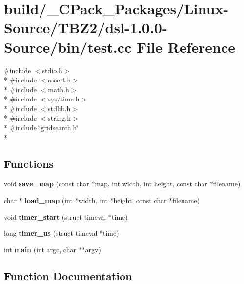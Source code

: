 \section{build/\-\_\-\-C\-Pack\-\_\-\-Packages/\-Linux-\/\-Source/\-T\-B\-Z2/dsl-\/1.0.0-\/\-Source/bin/test.cc File Reference}
\label{build_2__CPack__Packages_2Linux-Source_2TBZ2_2dsl-1_80_80-Source_2bin_2test_8cc}
{\ttfamily \#include $<$stdio.\-h$>$}\\*
{\ttfamily \#include $<$assert.\-h$>$}\\*
{\ttfamily \#include $<$math.\-h$>$}\\*
{\ttfamily \#include $<$sys/time.\-h$>$}\\*
{\ttfamily \#include $<$stdlib.\-h$>$}\\*
{\ttfamily \#include $<$string.\-h$>$}\\*
{\ttfamily \#include \char`\"{}gridsearch.\-h\char`\"{}}\\*
\subsection*{Functions}
\begin{DoxyCompactItemize}
\item 
void {\bf save\-\_\-map} (const char $\ast$map, int width, int height, const char $\ast$filename)
\item 
char $\ast$ {\bf load\-\_\-map} (int $\ast$width, int $\ast$height, const char $\ast$filename)
\item 
void {\bf timer\-\_\-start} (struct timeval $\ast$time)
\item 
long {\bf timer\-\_\-us} (struct timeval $\ast$time)
\item 
int {\bf main} (int argc, char $\ast$$\ast$argv)
\end{DoxyCompactItemize}


\subsection{Function Documentation}
